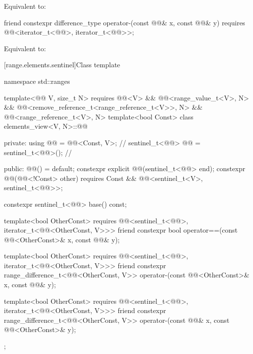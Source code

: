 \begin{itemdescr}
\pnum
\effects
Equivalent to: 
\end{itemdescr}

%
\begin{itemdecl}
friend constexpr difference_type operator-(const @@& x, const @@& y)
  requires @@<iterator_t<@@>, iterator_t<@@>>;
\end{itemdecl}

\begin{itemdescr}
\pnum
\effects
Equivalent to: 
\end{itemdescr}

[range.elements.sentinel]{Class template }

%
\begin{codeblock}
namespace std::ranges {
  template<@@ V, size_t N>
    requires @@<V> && @@<range_value_t<V>, N> &&
             @@<remove_reference_t<range_reference_t<V>>, N> &&
             @@<range_reference_t<V>, N>
  template<bool Const>
  class elements_view<V, N>::@@ {
  private:
    using @@ = @@<Const, V>;                 // \expos
    sentinel_t<@@> @@ = sentinel_t<@@>();         // \expos

  public:
    @@() = default;
    constexpr explicit @@(sentinel_t<@@> end);
    constexpr @@(@@<!Const> other)
      requires Const && @@<sentinel_t<V>, sentinel_t<@@>>;

    constexpr sentinel_t<@@> base() const;

    template<bool OtherConst>
      requires @@<sentinel_t<@@>, iterator_t<@@<OtherConst, V>>>
    friend constexpr bool operator==(const @@<OtherConst>& x, const @@& y);

    template<bool OtherConst>
      requires @@<sentinel_t<@@>, iterator_t<@@<OtherConst, V>>>
    friend constexpr range_difference_t<@@<OtherConst, V>>
      operator-(const @@<OtherConst>& x, const @@& y);

    template<bool OtherConst>
      requires @@<sentinel_t<@@>, iterator_t<@@<OtherConst, V>>>
    friend constexpr range_difference_t<@@<OtherConst, V>>
      operator-(const @@& x, const @@<OtherConst>& y);
  };
}
\end{codeblock}

